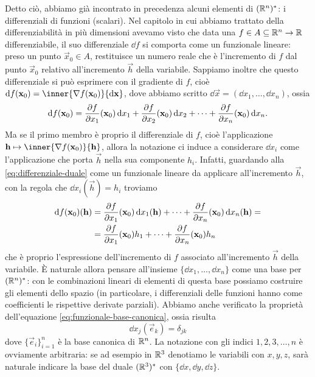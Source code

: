 Detto ciò, abbiamo già incontrato in precedenza alcuni elementi di $(\mathbb{R}^n)^*$: i differenziali di funzioni (scalari).
Nel capitolo in cui abbiamo trattato della differenziabilità in più dimensioni avevamo visto che data una $f\in A\subseteq\mathbb{R}^n\to\mathbb{R}$ differenziabile, il suo differenziale $\dd f$ si comporta come un funzionale lineare: preso un punto $\vec x_0\in A$, restituisce un numero reale che è l'incremento di $f$ dal punto $\vec x_0$ relativo all'incremento $\vec h$ della variabile.
Sappiamo inoltre che questo differenziale si può esprimere con il gradiente di $f$, cioè $\dd f(\vec x_0)=\inner{\grad f(\vec x_0)}{\dd\vec x}$, dove abbiamo scritto $\dd\vec x=(\dd x_1,\dots,\dd x_n)$, ossia
\begin{equation}
	\textup{d} f(\mathbf{x}_0)=\frac{\partial {f}}{\partial {x_1}}(\mathbf{x}_0)\,\textup{d} x_1+\frac{\partial {f}}{\partial {x_2}}(\mathbf{x}_0)\,\textup{d} x_2+\dots+\frac{\partial {f}}{\partial {x_n}}(\mathbf{x}_0)\,\textup{d} x_n.
	\label{eq:differenziale-duale}
\end{equation}
Ma se il primo membro è proprio il differenziale di $f$, cioè l'applicazione $\vec h\mapsto\inner{\grad f(\vec x_0)}{\vec h}$, allora la notazione ci induce a considerare $\dd x_i$ come l'applicazione che porta $\vec h$ nella sua componente $h_i$.
Infatti, guardando alla \eqref{eq:differenziale-duale} come un funzionale lineare da applicare all'incremento $\vec h$, con la regola che $\dd x_i(\vec h)=h_i$ troviamo
\begin{equation}
	\begin{split}
		\textup{d} f(\mathbf{x}_0)(\mathbf{h})&=\frac{\partial {f}}{\partial {x_1}}(\mathbf{x}_0)\,\textup{d} x_1(\mathbf{h})+\dots+\frac{\partial {f}}{\partial {x_n}}(\mathbf{x}_0)\,\textup{d} x_n(\mathbf{h})=\\
		&=\frac{\partial {f}}{\partial {x_1}}(\mathbf{x}_0)h_1+\dots+\frac{\partial {f}}{\partial {x_n}}(\mathbf{x}_0)h_n
	\end{split}
\end{equation}
che è proprio l'espressione dell'incremento di $f$ associato all'incremento $\vec h$ della variabile.
È naturale allora pensare all'insieme $\{\dd x_1,\dots,\dd x_n\}$ come una base per $(\mathbb{R}^n)^*$: con le combinazioni lineari di elementi di questa base possiamo costruire gli elementi dello spazio (in particolare, i differenziali delle funzioni hanno come coefficienti le rispettive derivate parziali).
Abbiamo anche verificato la proprietà dell'equazione \eqref{eq:funzionale-base-canonica}, ossia risulta
\begin{equation}
	\dd x_j(\vec e_k)=\delta_{jk}
\end{equation}
dove $\{\vec e_i\}_{i=1}^n$ è la base canonica di $\mathbb{R}^n$.
La notazione con gli indici $1,2,3,\dots,n$ è ovviamente arbitraria: se ad esempio in $\mathbb{R}^3$ denotiamo le variabili con $x,y,z$, sarà naturale indicare la base del duale $(\mathbb{R}^3)^*$ con $\{\dd x,\dd y,\dd z\}$.


